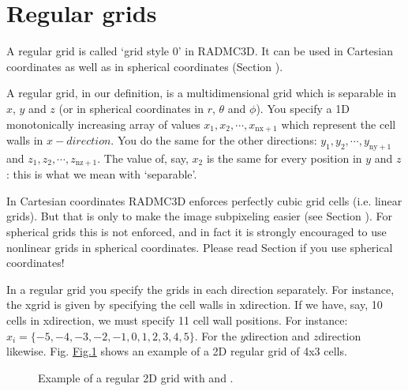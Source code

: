 \documentclass[letterpaper,10pt,english]{sphinxmanual}
\begin{document}
\section{Regular grids}
\label{\detokenize{gridding:regular-grids}}\label{\detokenize{gridding:sec-regular-grid}}
A regular grid is called ‘grid style 0’ in RADMC\sphinxhyphen{}3D. It can be used in
Cartesian coordinates as well as in spherical coordinates (Section
{\hyperref[\detokenize{basicstructure:sec-coord-systems}]{}}).

A regular grid, in our definition, is a multi\sphinxhyphen{}dimensional grid which is
separable in \(x\), \(y\) and \(z\) (or in spherical coordinates in
\(r\), \(\theta\) and \(\phi\)). You specify a 1\sphinxhyphen{}D monotonically
increasing array of values \(x_1, x_2,\cdots,x_{\mathrm{nx+1}}\) which
represent the cell walls in \(x-direction\).  You do the same for the other
directions: \(y_1, y_2,\cdots,y_{\mathrm{ny+1}}\) and \(z_1,
z_2,\cdots,z_{\mathrm{nz+1}}\).  The value of, say, \(x_2\) is the same for
every position in \(y\) and \(z\): this is what we mean with
‘separable’.

In Cartesian coordinates RADMC\sphinxhyphen{}3D enforces perfectly cubic grid cells (i.e.
linear grids). But that is only to make the image sub\sphinxhyphen{}pixeling easier (see
Section {\hyperref[\detokenize{imagesspectra:sec-recursive-subpixeling}]{}}). For spherical grids this is not
enforced, and in fact it is strongly encouraged to use non\sphinxhyphen{}linear grids in
spherical coordinates. Please read Section {\hyperref[\detokenize{gridding:sec-separable-refinement}]{}}
if you use spherical coordinates!

In a regular grid you specify the grids in each direction separately.  For
instance, the x\sphinxhyphen{}grid is given by specifying the cell walls in x\sphinxhyphen{}direction. If we
have, say, 10 cells in x\sphinxhyphen{}direction, we must specify 11 cell wall positions. For
instance: \(x_i=\{-5,-4,-3,-2,-1,0,1,2,3,4,5\}\).  For the
\(y\)\sphinxhyphen{}direction and \(z\)\sphinxhyphen{}direction
likewise. Fig. \hyperref[\detokenize{gridding:fig-regular-grid}]{Fig.\@ \ref{\detokenize{gridding:fig-regular-grid}}} shows an example of a 2\sphinxhyphen{}D regular grid
of 4x3 cells.

\begin{figure}[htbp]
\centering
\capstart

\noindent{}
\caption{Example of a regular 2\sphinxhyphen{}D grid with  and .}\label{\detokenize{gridding:id1}}\label{\detokenize{gridding:fig-regular-grid}}\end{figure}
\end{document}
